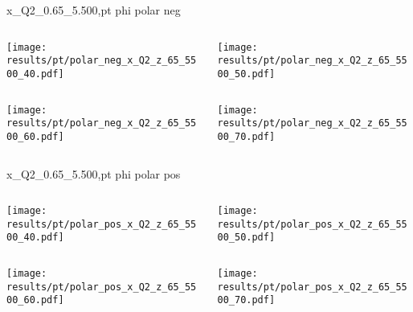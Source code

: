 \begin{frame}{x\_Q2\_0.65\_5.500,pt phi polar neg}
\begin{columns}
\begin{column}[T]{0.5\textwidth}
\texttt{[image: results/pt/polar\_neg\_x\_Q2\_z\_65\_5500\_40.pdf]}
\end{column}
\begin{column}[T]{0.5\textwidth}
\texttt{[image: results/pt/polar\_neg\_x\_Q2\_z\_65\_5500\_50.pdf]}
\end{column}
\end{columns}
\begin{columns}
\begin{column}[T]{0.5\textwidth}
\texttt{[image: results/pt/polar\_neg\_x\_Q2\_z\_65\_5500\_60.pdf]}
\end{column}
\begin{column}[T]{0.5\textwidth}
\texttt{[image: results/pt/polar\_neg\_x\_Q2\_z\_65\_5500\_70.pdf]}
\end{column}
\end{columns}
\end{frame}
\begin{frame}{x\_Q2\_0.65\_5.500,pt phi polar pos}
\begin{columns}
\begin{column}[T]{0.5\textwidth}
\texttt{[image: results/pt/polar\_pos\_x\_Q2\_z\_65\_5500\_40.pdf]}
\end{column}
\begin{column}[T]{0.5\textwidth}
\texttt{[image: results/pt/polar\_pos\_x\_Q2\_z\_65\_5500\_50.pdf]}
\end{column}
\end{columns}
\begin{columns}
\begin{column}[T]{0.5\textwidth}
\texttt{[image: results/pt/polar\_pos\_x\_Q2\_z\_65\_5500\_60.pdf]}
\end{column}
\begin{column}[T]{0.5\textwidth}
\texttt{[image: results/pt/polar\_pos\_x\_Q2\_z\_65\_5500\_70.pdf]}
\end{column}
\end{columns}
\end{frame}
